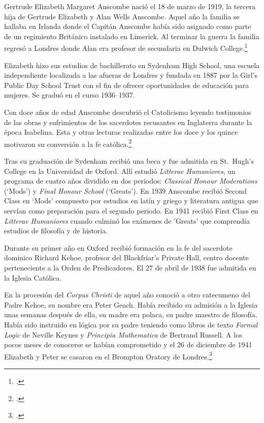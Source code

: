 Gertrude Elizabeth Margaret Anscombe nació el 18 de marzo de 1919, la tercera
hija de Gertrude Elizabeth y Alan Wells Anscombe. Aquel año la familia se
hallaba en Irlanda donde el Capitán Anscombe había sido asignado como parte de
un regimiento Británico instalado en Limerick. Al terminar la guerra la familia
regresó a Londres donde Alan era profesor de secundaria en Dulwich
College.\footcite[cf.~][p.~31]{biofellows}

Elizabeth hizo sus estudios de bachillerato en Sydenham High School, una
escuela independiente localizada a las afueras de Londres y fundada en 1887 por
la Girl's Public Day School Trust con el fin de ofrecer oportunidades de
educación para mujeres. Se graduó en el curso 1936--1937.

Con doce años de edad Anscombe descubrió el Catolicismo leyendo testimonios de
las obras y sufrimientos de los sacerdotes recusantes en Inglaterra durante la
época Isabelina. Esta y otras lecturas realizadas entre los doce y los quince
motivaron su conversión a la fe católica.\footcite[cf.~][p.~33]{biofellows}

Tras su graduación de Sydenham recibió una beca y fue admitida en St.~Hugh's
College en la Universidad de Oxford. Allí estudió \emph{Litterae Humaniores}, un
programa de cuatro años dividido en dos periodos: \emph{Classical Honour
  Moderations} (`Mods') y \emph{Final Honour School} (`Greats'). En 1939
Anscombe recibió Second Class en `Mods' compuesto por estudios en latín y griego
y literatura antigua que servían como preparación para el segundo periodo. En
1941 recibió First Class en \emph{Litterae Humaniores} cuando culminó los
exámenes de 'Greats' que comprendía estudios de filosofía y de historia.

Durante su primer año en Oxford recibió formación en la fe del sacerdote
dominico Richard Kehoe, profesor del Blackfriar's Private Hall, centro docente
perteneciente a la Orden de Predicadores. El 27 de abril de 1938 fue admitida en
la Iglesia Católica.

En la procesión del \emph{Corpus Christi} de aquel año conoció a otro catecumeno
del Padre Kehoe, su nombre era Peter Geach. Había recibido su admisión a la
Iglesia unas semanas después de ella, su madre era polaca, su padre maestro de
filosofía. Había sido instruido en lógica por su padre teniendo como libros de
texto \emph{Formal Logic} de Neville Keynes y \emph{Principia Mathematica} de
Bertrand Russell. A los pocos meses de conocerse se habían comprometido y el 26
de diciembre de 1941 Elizabeth y Peter se casaron en el Brompton Oratory de
Londres.\footcite[cf.~][p.~33]{biofellows}

